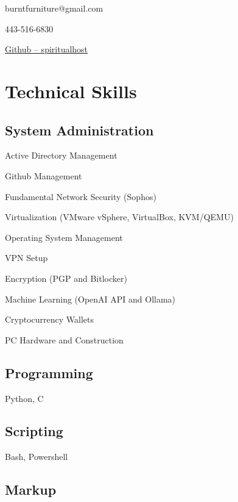 \documentclass{article}
\makeatletter
\renewcommand{\maketitle}{
	\begin{center}
		{\huge\bfseries\theauthor}
		
		\vspace{.5em}

		burntfurniture@gmail.com

		443-516-6830

		\href{https://github.com/spiritualhost}{Github -- spiritualhost}
	\end{center}
}
\makeatother
\begin{document}
\noindent

\author{Ryan Piazza}

\maketitle

\section{Technical Skills}

\subsection{System Administration}
\vspace{-1em} %

\begin{multicols}{2}
	\begin{compactitem}
		\item Active Directory Management
		\item Github Management
		\item Fundamental Network Security (Sophos)
		\item Virtualization (VMware vSphere, VirtualBox, KVM/QEMU)
		\item Operating System Management
		\item VPN Setup
		\item Encryption (PGP and Bitlocker)
		\item Machine Learning (OpenAI API and Ollama)
		\item Cryptocurrency Wallets
		\item PC Hardware and Construction
	\end{compactitem}
\end{multicols}

\subsection{Programming}

Python, C

\subsection{Scripting} 

Bash, Powershell

\subsection{Markup}
\end{document}
